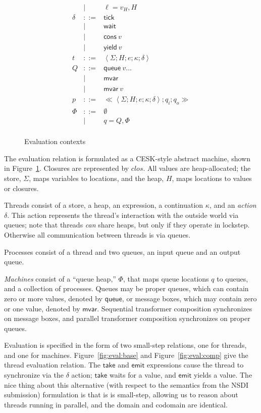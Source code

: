 \documentclass[twocolumn]{article}
\newcommand{\bnfdef}{::=}
\newcommand{\bnfalt}{\mathrel{\mid}}
\newcommand{\kw}[1]{\textsf{#1}}
\newcommand{\thread}[5]{\left<#1; #2; #3; #4; #5\right>}
\newcommand{\proc}[3]{\ll\!#1; #2; #3\!\gg}
\begin{document}
\begin{figure}
\begin{equation*}
\begin{array}{lcl}
     & \bnfalt & \ell = v_H, H \\
  \delta
     & \bnfdef & \kw{tick} \\
     & \bnfalt & \kw{wait} \\
     & \bnfalt & \kw{cons}~ v \\
     & \bnfalt & \kw{yield}~ v \\
  t
     & \bnfdef & \thread{\Sigma}{H}{e}{\kappa}{\delta} \\
  Q
     & \bnfdef & \kw{queue}~ v \ldots \\
     & \bnfalt & \kw{mvar} \\
     & \bnfalt & \kw{mvar}~ v \\
  p
     & \bnfdef & \proc{\thread{\Sigma}{H}{e}{\kappa}{\delta}}{q_i}{q_o} \\
  \Phi
     & \bnfdef & \emptyset \\
     & \bnfalt & q = Q, \Phi \\
\end{array}
\end{equation*}
\caption{Evaluation contexts}
\label{fig:lang:context}
\end{figure}

The evaluation relation is formulated as a CESK-style abstract machine, shown in
Figure~\ref{fig:lang:context}. Closures are represented by $clos$. All values
are heap-allocated; the store, $\Sigma$, maps variables to locations, and the
heap, $H$, maps locations to values or closures.

Threads consist of a store, a heap, an expression, a continuation $\kappa$, and
an \emph{action} $\delta$. This action represents the thread's interaction with
the outside world via queues; note that threads \emph{can} share heaps, but only
if they operate in lockstep. Otherwise all communication between threads is via
queues.

Processes consist of a thread and two queues, an input queue and an output
queue.

\emph{Machines} consist of a ``queue heap,'' $\Phi$, that maps queue locations
$q$ to queues, and a collection of processes. Queues may be proper queues, which
can contain zero or more values, denoted by $\kw{queue}$, or message boxes,
which may contain zero or one value, denoted by $\kw{mvar}$. Sequential
transformer composition synchronizes on message boxes, and parallel transformer
composition synchronizes on proper queues.

Evaluation is specified in the form of two small-step relations, one for
threads, and one for machines. Figure~\ref{fig:eval:base} and
Figure~\ref{fig:eval:comp} give the thread evaluation relation. The $\kw{take}$
and $\kw{emit}$ expressions cause the thread to synchronize via the $\delta$
action; $\kw{take}$ waits for a value, and $\kw{emit}$ yields a value. The nice
thing about this alternative (with respect to the semantics from the NSDI
submission) formulation is that is is small-step, allowing us to reason about
threads running in parallel, and the domain and codomain are identical.
\end{document}
